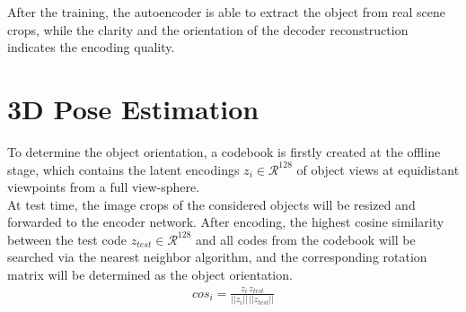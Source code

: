 After the training, the autoencoder is able to extract the object from real scene crops, while the clarity and the orientation of the decoder reconstruction indicates the encoding quality. 

\section{3D Pose Estimation}
To determine the object orientation, a codebook is firstly created at the offline stage, which contains the latent encodings $z_i \in \mathcal{R}^{128} $ of object views at equidistant viewpoints from a full view-sphere. 
 \\[8pt]
 At test time, the image crops of the considered objects will be resized and forwarded to the encoder network. After encoding, the highest cosine similarity between the test code $z_{test} \in \mathcal{R}^{128}$ and all codes from the codebook will be searched via the nearest neighbor algorithm, and the corresponding rotation matrix will be determined as the object orientation.  
\begin{align}
cos_i = \frac{z_i \, z_{test}}{||z_i||\, ||z_{test}||}
\label{eq:cosineloss} 
\end{align}